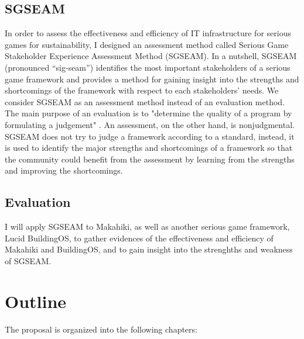 \subsection{SGSEAM}
In order to assess the effectiveness and efficiency of IT infrastructure for serious games for 
sustainability, I designed an assessment method called Serious Game Stakeholder Experience Assessment Method (SGSEAM). In a nutshell, SGSEAM (pronounced ``sig-seam'') identifies the most important stakeholders of a
serious game framework and provides a method for gaining insight into the strengths
and shortcomings of the framework with respect to each stakeholders' needs. We consider
SGSEAM as an assessment method instead of an evaluation method. The main purpose of an
evaluation is to "determine the quality of a program by formulating a judgement"
\cite{hurteau2009legitimate}. An assessment, on the other hand, is nonjudgmental. SGSEAM does
not try to judge a framework according to a standard, instead, it is used to identify the major
strengths and shortcomings of a framework so that the community could benefit from the
assessment by learning from the strengths and improving the shortcomings.

\subsection{Evaluation}
I will apply SGSEAM to Makahiki, as well as another serious game framework, Lucid BuildingOS\cite{building-dashboard}, to gather evidences of the effectiveness and efficiency of Makahiki and BuildingOS, and to gain insight into the strenghths and weakness of SGSEAM.

\section{Outline}

The proposal is organized into the following chapters:

